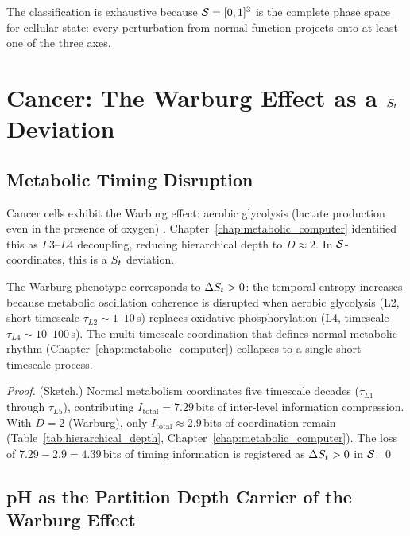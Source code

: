 The classification is exhaustive because $\mathcal{S} = [0,1]^3$ is the complete
phase space for cellular state: every perturbation from normal function projects
onto at least one of the three axes.

\section{Cancer: The Warburg Effect as a \texorpdfstring{$S_t$}{St} Deviation}
\label{sec:cancer_warburg}

\subsection{Metabolic Timing Disruption}
\label{ssec:warburg_timing}

Cancer cells exhibit the Warburg effect: aerobic glycolysis (lactate production
even in the presence of oxygen) \citep{Warburg1956}. Chapter~\ref{chap:metabolic_computer}
identified this as $L3$--$L4$ decoupling, reducing hierarchical depth to
$D \approx 2$. In $\mathcal{S}$-coordinates, this is a $S_t$ deviation.

\begin{proposition}
\label{prop:cancer_st}
The Warburg phenotype corresponds to $\Delta S_t > 0$:
the temporal entropy increases because metabolic oscillation coherence is
disrupted when aerobic glycolysis (L2, short timescale
$\tau_{L2} \sim 1$--$10$\,s) replaces oxidative phosphorylation (L4,
timescale $\tau_{L4} \sim 10$--$100$\,s). The multi-timescale coordination
that defines normal metabolic rhythm (Chapter~\ref{chap:metabolic_computer})
collapses to a single short-timescale process.
\end{proposition}

\begin{proof}
(Sketch.) Normal metabolism coordinates five timescale decades
($\tau_{L1}$ through $\tau_{L5}$), contributing $I_{\mathrm{total}} = 7.29$\,bits
of inter-level information compression. With $D = 2$ (Warburg), only
$I_{\mathrm{total}} \approx 2.9$\,bits of coordination remain
(Table~\ref{tab:hierarchical_depth}, Chapter~\ref{chap:metabolic_computer}).
The loss of $7.29 - 2.9 = 4.39$\,bits of timing information is registered as
$\Delta S_t > 0$ in $\mathcal{S}$. \qed
\end{proof}

\subsection{pH as the Partition Depth Carrier of the Warburg Effect}
\label{ssec:warburg_ph}

